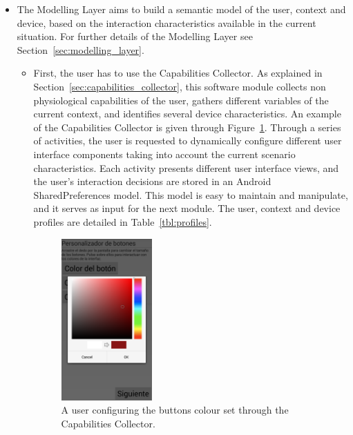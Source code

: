 \begin{itemize}
  \item The Modelling Layer aims to build a semantic model of the user, context
  and device, based on the interaction characteristics available in the current
  situation. For further details of the Modelling Layer see Section~\ref{sec:modelling_layer}.
  
  \begin{itemize}
    \item First, the user has to use the Capabilities Collector. As explained in 
    Section~\ref{sec:capabilities_collector}, this software module collects non 
    physiological capabilities of the user, gathers different variables of the 
    current context, and identifies several device characteristics. An example of 
    the Capabilities Collector is given through 
    Figure~\ref{fig:capabilities_collector_scenario}. Through a series of
    activities, the user is requested to dynamically configure different user 
    interface components taking into account the current scenario characteristics. 
    Each activity presents different user interface views, and the user's
    interaction decisions are stored in an Android SharedPreferences model.
    This model is easy to maintain and manipulate, and it serves as input for
    the next module. The user, context and device profiles are detailed in 
    Table~\ref{tbl:profiles}.
    
\begin{figure}
\centering
\includegraphics[width=0.35\textwidth]{capabilities_collector_scenario.png}
\caption{A user configuring the buttons colour set through the Capabilities Collector.}
\label{fig:capabilities_collector_scenario}
\end{figure}
    

\end{itemize}
\end{itemize}
